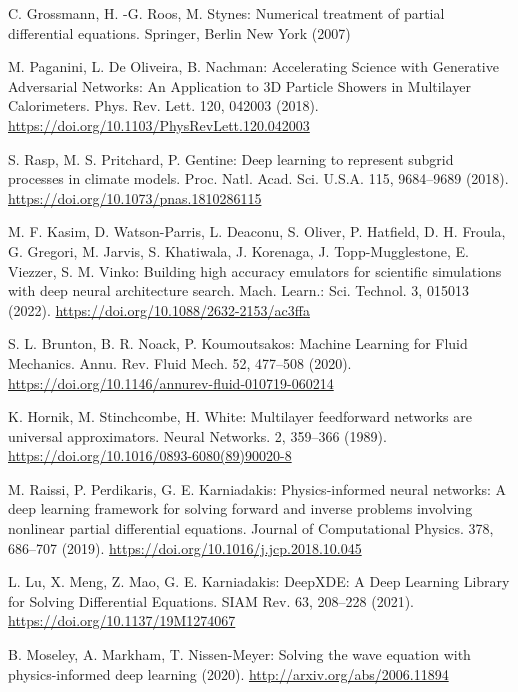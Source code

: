 \documentclass[reprint,
superscriptaddress,
amsmath,amssymb,aps,showkeys,showpacs,
twoside,final,secnumarabic,%
nofootinbib]{revtex4-2}
\begin{document}
\begin{thebibliography}{}
C. Grossmann, H. -G. Roos, M. Stynes: Numerical treatment of partial differential equations. Springer, Berlin New York (2007)

M. Paganini, L. De Oliveira, B. Nachman: Accelerating Science with Generative Adversarial Networks: An Application to 3D Particle Showers in Multilayer Calorimeters. Phys. Rev. Lett. 120, 042003 (2018). \url{https://doi.org/10.1103/PhysRevLett.120.042003}

S. Rasp, M. S. Pritchard, P. Gentine: Deep learning to represent subgrid processes in climate models. Proc. Natl. Acad. Sci. U.S.A. 115, 9684–9689 (2018). \url{https://doi.org/10.1073/pnas.1810286115}

M. F. Kasim, D. Watson-Parris, L. Deaconu, S. Oliver, P. Hatfield, D. H. Froula, G. Gregori, M. Jarvis, S. Khatiwala, J. Korenaga, J. Topp-Mugglestone, E. Viezzer, S. M. Vinko: Building high accuracy emulators for scientific simulations with deep neural architecture search. Mach. Learn.: Sci. Technol. 3, 015013 (2022). \url{https://doi.org/10.1088/2632-2153/ac3ffa}

S. L. Brunton, B. R. Noack, P. Koumoutsakos: Machine Learning for Fluid Mechanics. Annu. Rev. Fluid Mech. 52, 477–508 (2020). \url{https://doi.org/10.1146/annurev-fluid-010719-060214}

K. Hornik, M. Stinchcombe, H. White: Multilayer feedforward networks are universal approximators. Neural Networks. 2, 359–366 (1989). \url{https://doi.org/10.1016/0893-6080(89)90020-8}

M. Raissi, P. Perdikaris, G. E. Karniadakis: Physics-informed neural networks: A deep learning framework for solving forward and inverse problems involving nonlinear partial differential equations. Journal of Computational Physics. 378, 686–707 (2019). \url{https://doi.org/10.1016/j.jcp.2018.10.045}

L. Lu, X. Meng, Z. Mao, G. E. Karniadakis: DeepXDE: A Deep Learning Library for Solving Differential Equations. SIAM Rev. 63, 208–228 (2021). \url{https://doi.org/10.1137/19M1274067}

B. Moseley, A. Markham, T. Nissen-Meyer: Solving the wave equation with physics-informed deep learning (2020). \url{http://arxiv.org/abs/2006.11894}


\end{thebibliography}
\end{document}
